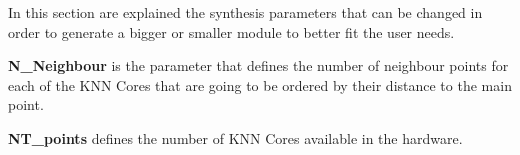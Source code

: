 In this section are explained the synthesis parameters that can be changed in
order to generate a bigger or smaller module to better fit the user needs.

\textbf{N\_Neighbour} is the parameter that defines the number of neighbour points for each of the KNN Cores that are going to be ordered by their distance to the main point.

\textbf{NT\_points} defines the number of KNN Cores available in the hardware.
